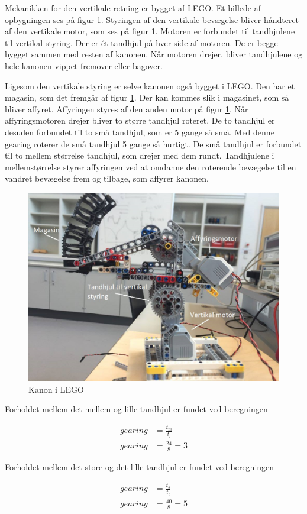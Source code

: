 Mekanikken for den vertikale retning er bygget af LEGO. Et billede af opbygningen ses på figur \ref{fig:kanon}. Styringen af den vertikale bevægelse bliver håndteret af den vertikale motor, som ses på figur \ref{fig:kanon}. Motoren er forbundet til tandhjulene til vertikal styring. Der er ét tandhjul på hver side af motoren. De er begge bygget sammen med resten af kanonen. Når motoren drejer, bliver tandhjulene og hele kanonen vippet fremover eller bagover. 

Ligesom den vertikale styring er selve kanonen også bygget i LEGO. Den har et magasin, som det fremgår af figur \ref{fig:kanon}. Der kan kommes slik i magasinet, som så bliver affyret. Affyringen styres af den anden motor på figur \ref{fig:kanon}. Når affyringsmotoren drejer bliver to større tandhjul roteret. De to tandhjul er desuden forbundet til to små tandhjul, som er 5 gange så små. Med denne gearing roterer de små tandhjul 5 gange så hurtigt. De små tandhjul er forbundet til to mellem størrelse tandhjul, som drejer med dem rundt. Tandhjulene i mellemstørrelse styrer affyringen ved at omdanne den roterende bevægelse til en vandret bevægelse frem og tilbage, som affyrer kanonen.

\begin{figure}[H]
	\centering
	\includegraphics[width=1\textwidth]{Afsnit/DesignOgImplementering/images/kanon}
	\caption{Kanon i LEGO}
	\label{fig:kanon}
\end{figure}

Forholdet mellem det mellem og lille tandhjul er fundet ved beregningen 

\begin{align}
	gearing&=\frac{t_{m}}{t_{l}} \\ \nonumber 
	gearing&= \frac{24}{8} = 3
\end{align}

Forholdet mellem det store og det lille tandhjul er fundet ved beregningen 

\begin{align}
	gearing&= \frac{t_{s}}{t_{l}} \\ \nonumber 
	gearing &= \frac{40}{8}=5
\end{align}






